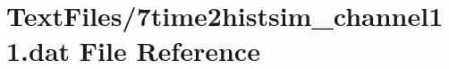 \hypertarget{7time2histsim__channel11_8dat}{}\section{Text\+Files/7time2histsim\+\_\+channel11.dat File Reference}
\label{7time2histsim__channel11_8dat}
